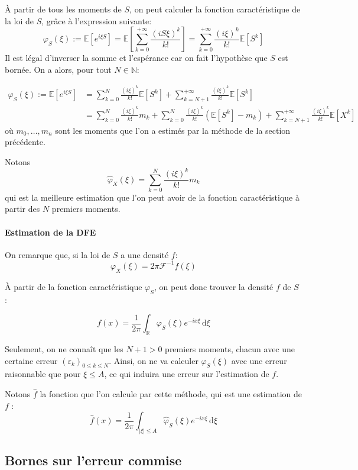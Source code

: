 \documentclass[12pt]{article}
\newcommand{\pth}[1]{\left(#1\right)}
\newcommand{\cro}[1]{\left[#1\right]}
\newcommand{\abs}[1]{\left|#1\right|}
\newcommand{\de}{\,\mathrm{d}}
\newcommand{\En}{\mathbb{N}}
\newcommand{\Esp}[1]{\mathbb{E}\cro{#1}}
\begin{document}
À partir de tous les moments de $S$, on peut calculer la fonction caractéristique de la loi de $S$, grâce à l'expression suivante:
\[\varphi_S(\xi):=\Esp{e^{i\xi S}}=\Esp{\sum_{k=0}^{+\infty}\frac{(iS\xi)^k}{k!}}=\sum_{k=0}^{+\infty}\frac{(i\xi)^k}{k!}\Esp{S^k}\]
Il est légal d'inverser la somme et l'espérance car on fait l'hypothèse que $S$ est bornée. On a alors, pour tout $N\in\En$:

\begin{align*}
\varphi_S(\xi):=\Esp{e^{i\xi S}}
&=\sum_{k=0}^{N}\frac{(i\xi)^k}{k!}\Esp{S^k}+\sum_{k=N+1}^{+\infty}\frac{(i\xi)^k}{k!}\Esp{S^k}\\
&= \sum_{k=0}^{N}\frac{(i\xi)^k}{k!}m_k + \sum_{k=0}^{N}\frac{(i\xi)^k}{k!}\pth{\Esp{S^k}-m_k}+\sum_{k=N+1}^{+\infty}\frac{(i\xi)^k}{k!}\Esp{X^k}
\end{align*}
où $m_0,\hdots, m_n$ sont les moments que l'on a estimés par la méthode de la section précédente.

Notons \[\hat{\varphi}_X(\xi)=\sum_{k=0}^{N}\frac{(i\xi)^k}{k!}m_k\] qui est la meilleure estimation que l'on peut avoir de la fonction caractéristique à partir des $N$ premiers moments.

\paragraph{Estimation de la DFE}

On remarque que, si la loi de $S$ a une densité $f$:
\[\varphi_X(\xi)=2\pi \mathcal{F}^{-1}f(\xi)\]

À partir de la fonction caractéristique $\varphi_S$, on peut donc trouver la densité $f$ de $S$ :

\[f(x) = \frac1{2\pi} \int_{\mathbb R}\varphi_S(\xi)e^{-ix\xi}\de\xi\]

Seulement, on ne connaît que les $N+1>0$ premiers moments, chacun avec une certaine erreur $(\varepsilon_k)_{0\leqslant k\leqslant N}$. Ainsi, on ne va calculer $\varphi_S(\xi)$ avec une erreur raisonnable que pour $\xi\leqslant A$, ce qui induira une erreur sur l'estimation de $f$.

Notons $\hat{f}$ la fonction que l'on calcule par cette méthode, qui est une estimation de $f$ : 
\begin{equation}\label{dfe1}
  \hat{f}(x) = \frac1{2\pi} \int_{\abs{\xi}\leqslant A}\hat\varphi_S(\xi)e^{-ix\xi}\de\xi
\end{equation}

\subsection{Bornes sur l'erreur commise}
\end{document}
